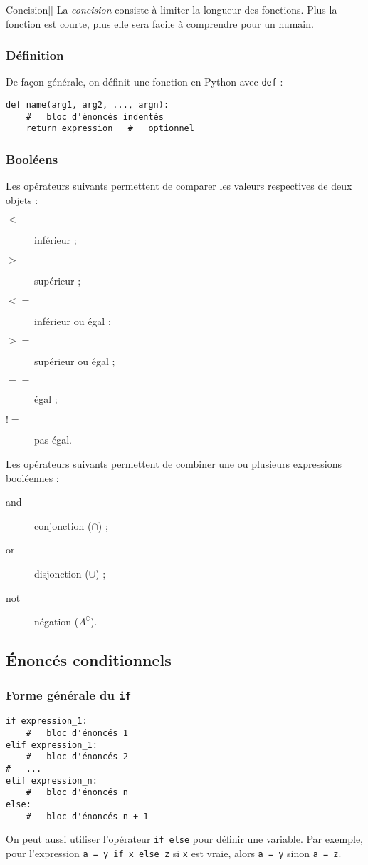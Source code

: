 \documentclass[10pt, french]{article}
\begin{document}
\begin{multicols*}{2}
\begin{definitionGENERAL}{Concision}[]
La \textit{\textit{concision}} consiste à limiter la longueur des fonctions. Plus la fonction est courte, plus elle sera facile à comprendre pour un humain.
\end{definitionGENERAL}


\subsubsection{Définition}
De façon générale, on définit une fonction en Python avec \texttt{def} :
\begin{lstlisting}
def name(arg1, arg2, ..., argn):
	#	bloc d'énoncés indentés
	return expression	#	optionnel
\end{lstlisting}



\subsubsection{Booléens}
Les opérateurs suivants permettent de comparer les valeurs respectives de deux objets : 
\begin{description}
	\item[$<$]	inférieur ;
	\item[$>$]	supérieur ;
	\item[$<=$]	inférieur ou égal ;
	\item[$>=$]	supérieur ou égal ;
	\item[$==$]	égal ;
	\item[$!=$]	pas égal.
\end{description}

\bigskip

Les opérateurs suivants permettent de combiner une ou plusieurs expressions booléennes : 
\begin{description}
	\item[and]	conjonction ($\cap$) ;
	\item[or]	disjonction ($\cup$) ;
	\item[not]	négation ($A^{\complement}$).
\end{description}

\subsection{Énoncés conditionnels}
\subsubsection{Forme générale du \texttt{if}}
\begin{lstlisting}
if expression_1:
	#	bloc d'énoncés 1
elif expression_1:
	#	bloc d'énoncés 2
#	...
elif expression_n:
	#	bloc d'énoncés n
else:
	#	bloc d'énoncés n + 1
\end{lstlisting}

On peut aussi utiliser l'opérateur \texttt{if else} pour définir une variable. Par exemple, pour l'expression \texttt{a = y if x else z} si \texttt{x} est vraie, alors \texttt{a = y} sinon \texttt{a = z}.

\end{multicols*}
\end{document}
